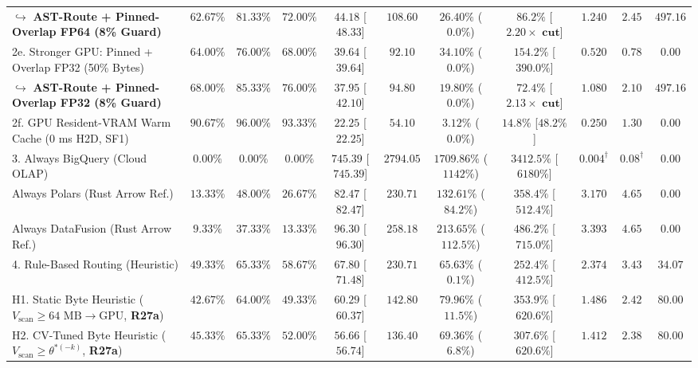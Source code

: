 \documentclass[10pt,a4paper]{article}
\newenvironment{fitasttable}{%
  \begin{lrbox}{\asttblbox}%
}{%
  \end{lrbox}%
  \sbox{\asttblboxB}{%
    \ifdim\wd\asttblbox>0.96\textwidth
      \resizebox{0.96\textwidth}{!}{\usebox{\asttblbox}}%
    \else
      \usebox{\asttblbox}%
    \fi
  }%
  \ifdim\ht\asttblboxB>0.72\textheight
    \resizebox{!}{0.72\textheight}{\usebox{\asttblboxB}}%
  \else
    \usebox{\asttblboxB}%
  \fi
}
\begin{document}
\begin{table}[!htbp]
\begin{fitasttable}
\begin{tabular}{@{}lcccccccccc@{}}
\hspace*{0.8em}$\hookrightarrow$ \textbf{AST-Route + Pinned-Overlap FP64 (8\% Guard)} & $\mathbf{62.67\%}$ & $\mathbf{81.33\%}$ & $\mathbf{72.00\%}$ & $\mathbf{44.18}$ [$\mathbf{48.33}$] & $\mathbf{108.60}$ & $\mathbf{26.40\%}$ ($\mathbf{0.0\%}$) & $\mathbf{86.2\%}$ [$\mathbf{2.20\times\text{ cut}}$] & $\mathbf{1.240}$ & $\mathbf{2.45}$ & $\mathbf{497.16}$ \\
2e. Stronger GPU: Pinned + Overlap FP32 (50\% Bytes) & $64.00\%$ & $76.00\%$ & $68.00\%$ & $39.64$ [$39.64$] & $92.10$ & $34.10\%$ ($0.0\%$) & $154.2\%$ [$390.0\%$] & $0.520$ & $0.78$ & $0.00$ \\
\hspace*{0.8em}$\hookrightarrow$ \textbf{AST-Route + Pinned-Overlap FP32 (8\% Guard)} & $\mathbf{68.00\%}$ & $\mathbf{85.33\%}$ & $\mathbf{76.00\%}$ & $\mathbf{37.95}$ [$\mathbf{42.10}$] & $\mathbf{94.80}$ & $\mathbf{19.80\%}$ ($\mathbf{0.0\%}$) & $\mathbf{72.4\%}$ [$\mathbf{2.13\times\text{ cut}}$] & $\mathbf{1.080}$ & $\mathbf{2.10}$ & $\mathbf{497.16}$ \\
2f. GPU Resident-VRAM Warm Cache (0 ms H2D, SF1) & $90.67\%$ & $96.00\%$ & $93.33\%$ & $22.25$ [$22.25$] & $54.10$ & $3.12\%$ ($0.0\%$) & $14.8\%$ [$48.2\%$] & $0.250$ & $1.30$ & $0.00$ \\
3. Always BigQuery (Cloud OLAP) & $0.00\%$ & $0.00\%$ & $0.00\%$ & $745.39$ [$745.39$] & $2794.05$ & $1709.86\%$ ($1142\%$) & $3412.5\%$ [$6180\%$] & $0.004^{\dagger}$ & $0.08^{\dagger}$ & $0.00$ \\
Always Polars (Rust Arrow Ref.) & $13.33\%$ & $48.00\%$ & $26.67\%$ & $82.47$ [$82.47$] & $230.71$ & $132.61\%$ ($84.2\%$) & $358.4\%$ [$512.4\%$] & $3.170$ & $4.65$ & $0.00$ \\
Always DataFusion (Rust Arrow Ref.) & $9.33\%$ & $37.33\%$ & $13.33\%$ & $96.30$ [$96.30$] & $258.18$ & $213.65\%$ ($112.5\%$) & $486.2\%$ [$715.0\%$] & $3.393$ & $4.65$ & $0.00$ \\
4. Rule-Based Routing (Heuristic) & $49.33\%$ & $65.33\%$ & $58.67\%$ & $67.80$ [$71.48$] & $230.71$ & $65.63\%$ ($0.1\%$) & $252.4\%$ [$412.5\%$] & $2.374$ & $3.43$ & $34.07$ \\
H1. Static Byte Heuristic ($V_{\text{scan}}\ge 64\text{ MB}\rightarrow\text{GPU}$, \textbf{R27a}) & $42.67\%$ & $64.00\%$ & $49.33\%$ & $60.29$ [$60.37$] & $142.80$ & $79.96\%$ ($11.5\%$) & $353.9\%$ [$620.6\%$] & $1.486$ & $2.42$ & $80.00$ \\
H2. CV-Tuned Byte Heuristic ($V_{\text{scan}}\ge \theta^{*(-k)}$, \textbf{R27a}) & $45.33\%$ & $65.33\%$ & $52.00\%$ & $56.66$ [$56.74$] & $136.40$ & $69.36\%$ ($6.8\%$) & $307.6\%$ [$620.6\%$] & $1.412$ & $2.38$ & $80.00$ \\

\end{tabular}
\end{fitasttable}
\end{table}
\end{document}
